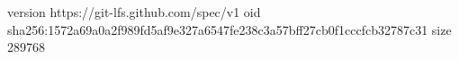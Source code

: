 version https://git-lfs.github.com/spec/v1
oid sha256:1572a69a0a2f989fd5af9e327a6547fe238c3a57bff27cb0f1cccfcb32787c31
size 289768
